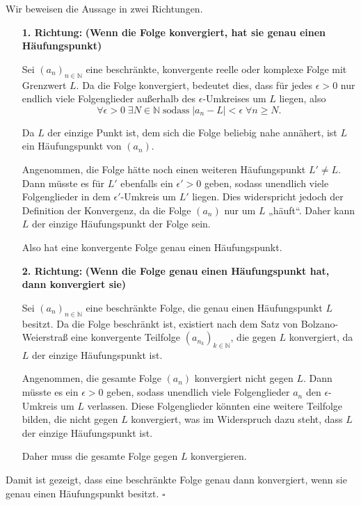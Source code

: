 \documentclass[11pt]{article}
\begin{document}
Wir beweisen die Aussage in zwei Richtungen.

\begin{enumerate}
    \item[\textbf{1. Richtung:}] \textbf{(Wenn die Folge konvergiert, hat sie genau einen Häufungspunkt)}

    Sei \( (a_n)_{n \in \mathbb{N}} \) eine beschränkte, konvergente reelle oder komplexe Folge mit Grenzwert \( L \). Da die Folge konvergiert, bedeutet dies, dass für jedes \( \epsilon > 0 \) nur endlich viele Folgenglieder außerhalb des \( \epsilon \)-Umkreises um \( L \) liegen, also
    \[
    \forall \epsilon > 0 \; \exists N \in \mathbb{N} \; \text{sodass} \; |a_n - L| < \epsilon \; \forall n \geq N.
    \]

    Da \( L \) der einzige Punkt ist, dem sich die Folge beliebig nahe annähert, ist \( L \) ein Häufungspunkt von \( (a_n) \).

    Angenommen, die Folge hätte noch einen weiteren Häufungspunkt \( L' \neq L \). Dann müsste es für \( L' \) ebenfalls ein \( \epsilon' > 0 \) geben, sodass unendlich viele Folgenglieder in dem \( \epsilon' \)-Umkreis um \( L' \) liegen. Dies widerspricht jedoch der Definition der Konvergenz, da die Folge \( (a_n) \) nur um \( L \) „häuft“. Daher kann \( L \) der einzige Häufungspunkt der Folge sein.

    Also hat eine konvergente Folge genau einen Häufungspunkt.

    \item[\textbf{2. Richtung:}] \textbf{(Wenn die Folge genau einen Häufungspunkt hat, dann konvergiert sie)}

    Sei \( (a_n)_{n \in \mathbb{N}} \) eine beschränkte Folge, die genau einen Häufungspunkt \( L \) besitzt. Da die Folge beschränkt ist, existiert nach dem Satz von Bolzano-Weierstraß eine konvergente Teilfolge \( (a_{n_k})_{k \in \mathbb{N}} \), die gegen \( L \) konvergiert, da \( L \) der einzige Häufungspunkt ist.

    Angenommen, die gesamte Folge \( (a_n) \) konvergiert nicht gegen \( L \). Dann müsste es ein \( \epsilon > 0 \) geben, sodass unendlich viele Folgenglieder \( a_n \) den \( \epsilon \)-Umkreis um \( L \) verlassen. Diese Folgenglieder könnten eine weitere Teilfolge bilden, die nicht gegen \( L \) konvergiert, was im Widerspruch dazu steht, dass \( L \) der einzige Häufungspunkt ist.

    Daher muss die gesamte Folge gegen \( L \) konvergieren.
\end{enumerate}

Damit ist gezeigt, dass eine beschränkte Folge genau dann konvergiert, wenn sie genau einen Häufungspunkt besitzt. \(\square\)
\end{document}
